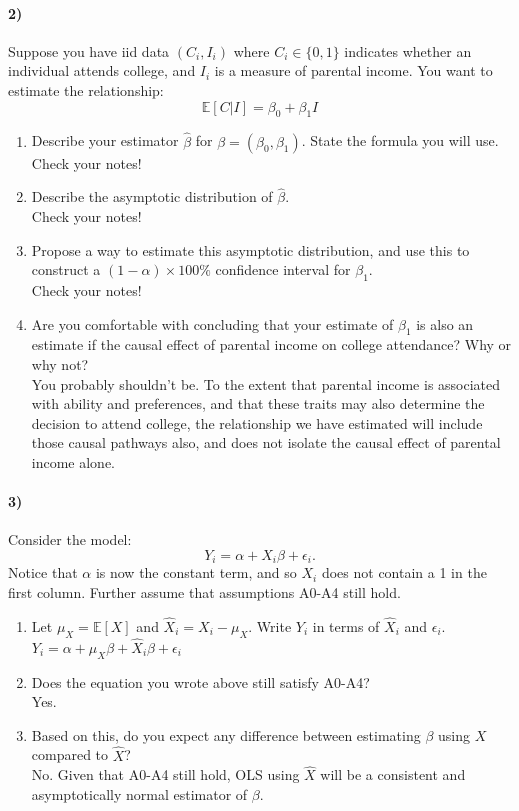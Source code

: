\documentclass[12pt]{article}
\newcommand\EE{\mathbb{E}}
\newcommand\h{\hat}
\newcommand\eps{\epsilon}
\numberwithin{equation}{section}
\numberwithin{figure}{section}
\numberwithin{table}{section}
\begin{document}
\paragraph{2)} Suppose you have iid data $(C_i,I_i)$ where $C_i\in\{0,1\}$ indicates whether an individual attends college, and $I_i$ is a measure of parental income. You want to estimate the relationship:
\[ \EE[C|I] = \beta_0 + \beta_1 I \]
\begin{enumerate}
\item Describe your estimator $\h\beta$ for $\beta=(\beta_0,\beta_1)$. State the formula you will use. \\
  {\color{blue} Check your notes!}
\item Describe the asymptotic distribution  of $\h\beta$. \\
  {\color{blue} Check your notes!}
\item Propose a way to estimate this asymptotic distribution, and use this to construct a $(1-\alpha)\times100\%$ confidence interval for $\beta_1$. \\
  {\color{blue} Check your notes!}
\item Are you comfortable with concluding that your estimate of $\beta_1$ is also an estimate if the causal effect of parental income on college attendance? Why or why not? \\
  {\color{blue} You probably shouldn't be.  To the extent that parental income is associated with ability and preferences, and that these traits may also determine the decision to attend college, the relationship we have estimated will include those causal pathways also, and does not isolate the causal effect of parental income alone.}
\end{enumerate}

\paragraph{3)} Consider the model:
\[ Y_i = \alpha + X_i\beta + \eps_i.\]
Notice that $\alpha$ is now the constant term, and so $X_i$ does not contain a 1 in the first column. Further assume that assumptions A0-A4 still hold.
\begin{enumerate}
\item Let $\mu_X = \EE[X]$ and $\hat{X}_i = X_i-\mu_X$. Write $Y_i$ in terms of $\h{X}_i$ and $\eps_i$. \\
  {\color{blue} $Y_i = \alpha + \mu_X\beta + \hat{X}_i\beta + \eps_i$ }
\item Does the equation you wrote above still satisfy A0-A4? \\
  {\color{blue} Yes.}
\item Based on this, do you expect any difference between estimating $\beta$ using $X$ compared to $\h{X}$? \\
  {\color{blue} No. Given that A0-A4 still hold, OLS using $\h{X}$ will be a consistent and asymptotically normal estimator of $\beta$.}
\end{enumerate}
\end{document}
